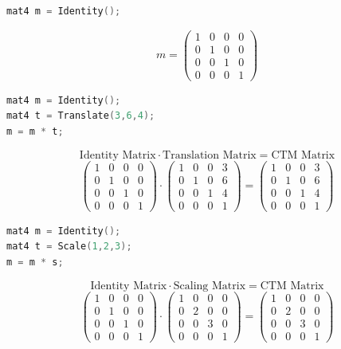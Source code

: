 \documentclass[a4paper, 14pt]{extarticle}
\begin{document}
\begin{lstlisting}[language=C]
mat4 m = Identity();
\end{lstlisting}
$$
m = \begin{pmatrix}
1 & 0 & 0 & 0\\
0 & 1 & 0 & 0\\
0 & 0 & 1 & 0\\
0 & 0 & 0 & 1
\end{pmatrix}
$$
\begin{lstlisting}[language=C]
mat4 m = Identity();
mat4 t = Translate(3,6,4);
m = m * t;
\end{lstlisting}
$$\textrm{Identity Matrix} \cdot \textrm{Translation Matrix} = \textrm{CTM Matrix}$$
$$
\begin{pmatrix}
1 & 0 & 0 & 0\\
0 & 1 & 0 & 0\\
0 & 0 & 1 & 0\\
0 & 0 & 0 & 1
\end{pmatrix}
\cdot
\begin{pmatrix}
1 & 0 & 0 & 3\\
0 & 1 & 0 & 6\\
0 & 0 & 1 & 4\\
0 & 0 & 0 & 1
\end{pmatrix}
=
\begin{pmatrix}
1 & 0 & 0 & 3\\
0 & 1 & 0 & 6\\
0 & 0 & 1 & 4\\
0 & 0 & 0 & 1
\end{pmatrix}
$$
\begin{lstlisting}[language=C]
mat4 m = Identity();
mat4 t = Scale(1,2,3);
m = m * s;
\end{lstlisting}
$$\textrm{Identity Matrix} \cdot \textrm{Scaling Matrix} = \textrm{CTM Matrix}$$
$$
\begin{pmatrix}
1 & 0 & 0 & 0\\
0 & 1 & 0 & 0\\
0 & 0 & 1 & 0\\
0 & 0 & 0 & 1
\end{pmatrix}
\cdot
\begin{pmatrix}
1 & 0 & 0 & 0\\
0 & 2 & 0 & 0\\
0 & 0 & 3 & 0\\
0 & 0 & 0 & 1
\end{pmatrix}
=
\begin{pmatrix}
1 & 0 & 0 & 0\\
0 & 2 & 0 & 0\\
0 & 0 & 3 & 0\\
0 & 0 & 0 & 1
\end{pmatrix}
$$
\end{document}
